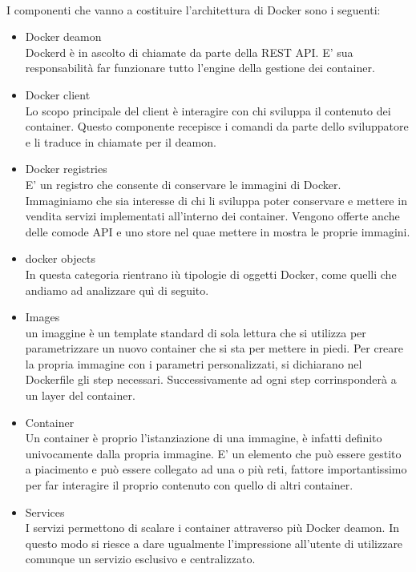 \paragraph{}
I componenti che vanno a costituire l'architettura di Docker sono i seguenti:
\begin{itemize}
	\item Docker deamon \\
	Dockerd è in ascolto di chiamate da parte della REST API. E' sua responsabilità far funzionare tutto l'engine della gestione dei container.
	\item Docker client \\
	Lo scopo principale del client è interagire con chi sviluppa il contenuto dei container. Questo componente recepisce i comandi da parte dello sviluppatore e li traduce in chiamate per il deamon.
	\item Docker registries \\
	E' un registro che consente di conservare le immagini di Docker. Immaginiamo che sia interesse di chi li sviluppa poter conservare e mettere in vendita servizi implementati all'interno dei container. Vengono offerte anche delle comode API e uno store nel quae mettere in mostra le proprie immagini.
	\item  docker objects \\
	In questa categoria rientrano iù tipologie di oggetti Docker, come quelli che andiamo ad analizzare quì di seguito.
	\item  Images \\
	un imaggine è un template standard di sola lettura che si utilizza per parametrizzare un nuovo container che si sta per mettere in piedi. Per creare la propria immagine  con i parametri personalizzati, si dichiarano nel Dockerfile gli step necessari. Successivamente ad ogni step corrinsponderà a un layer del container.
	\item  Container \\
	Un container è proprio l'istanziazione di una immagine, è infatti definito univocamente dalla propria immagine. E' un elemento che può essere gestito a piacimento e può essere collegato ad una o più reti, fattore importantissimo per far interagire il proprio contenuto con quello di altri container.
	\item Services \\
	I servizi permettono di scalare i container attraverso più Docker deamon. In questo modo si riesce a dare ugualmente l'impressione all'utente di utilizzare comunque un servizio esclusivo e centralizzato.
\end{itemize}



